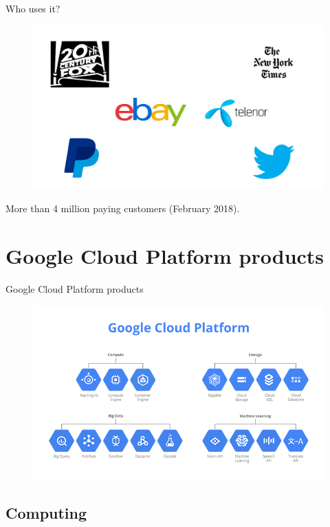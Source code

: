 \documentclass{beamer}
\begin{document}
\begin{frame}[fragile]{Who uses it?}
\begin{figure}[H]
  \centering
  \includegraphics[scale=0.35]{logos.png}
\end{figure}
More than 4 million paying customers (February 2018).
\end{frame}

\section{Google Cloud Platform products}

\begin{frame}[fragile]{Google Cloud Platform products}
\begin{figure}[H]
  \centering
  \includegraphics[width = \textwidth]{img/cloud_products}
\end{figure}

\end{frame}

\subsection{Computing}
\end{document}
